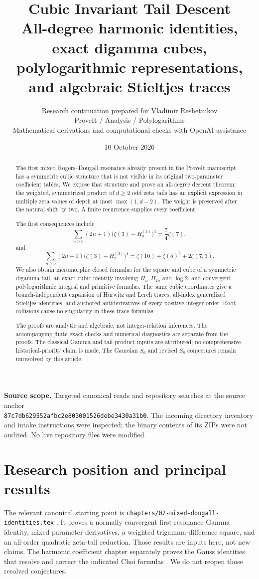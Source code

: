 \documentclass[11pt]{article}
\title{\textbf{Cubic Invariant Tail Descent}\\[5pt]
\large All-degree harmonic identities, exact digamma cubes,\\
polylogarithmic representations, and algebraic Stieltjes traces}
\author{Research continuation prepared for Vladimir Reshetnikov\\
\small ProveIt / Analysis / Polylogarithms\\
\small Mathematical derivations and computational checks with OpenAI assistance}
\date{10 October 2026}
\numberwithin{equation}{section}
\theoremstyle{definition}\newtheorem{definition}[theorem]{Definition}
\theoremstyle{remark}\newtheorem{remark}[theorem]{Remark}
\newcommand{\src}[1]{\nolinkurl{#1}}
\begin{document}
\maketitle
\begin{abstract}
The first mixed Rogers--Dougall resonance already present in the ProveIt
manuscript has a symmetric cubic structure that is not visible in its original
two-parameter coefficient tables. We expose that structure and prove an
all-degree descent theorem: the weighted, symmetrized product of $d\ge2$
odd zeta tails has an explicit expression in multiple zeta values of depth
at most $\max(1,d-2)$. The weight is preserved after the natural shift by
two. A finite recurrence supplies every coefficient.

The first consequences include
\[
 \sum_{n\ge0}(2n+1)\bigl(\zeta(3)-H_n^{(3)}\bigr)^3
       =\frac74\zeta(7),
\]
and
\[
 \sum_{n\ge0}(2n+1)\bigl(\zeta(3)-H_n^{(3)}\bigr)^4
       =\zeta(10)+\zeta(5)^2+2\zeta(7,3).
\]
We also obtain meromorphic closed formulas for the square and cube of a
symmetric digamma tail, an exact cubic identity involving $H_n,H_{2n}$ and
$\log2$, and convergent polylogarithmic integral and primitive formulas.
The same cubic coordinates give a branch-independent expansion of Hurwitz
and Lerch traces, all-index generalized Stieltjes identities, and anchored
antiderivatives of every positive integer order. Root collisions cause no
singularity in these trace formulas.

The proofs are analytic and algebraic, not integer-relation inferences.
The accompanying finite exact checks and numerical diagnostics are separate
from the proofs. The classical Gamma and tail-product inputs are attributed;
no comprehensive historical-priority claim is made. The Gaussian $S_6$ and
revised $S_8$ conjectures remain unresolved by this article.
\end{abstract}
\vfill
\noindent\small\textbf{Source scope.} Targeted canonical reads and repository
searches at the source anchor\\
\src{87c7db629552afbc2e803001526debe3430a31b0}.
The incoming directory inventory and intake instructions were inspected;
the binary contents of its ZIPs were not audited. No live repository files
were modified.\normalsize
\clearpage
\begingroup\small\setlength{\parskip}{0pt}
\tableofcontents
\endgroup
\clearpage

\section{Research position and principal results}
\label{ct:sec:position}
The relevant canonical starting point is
\src{chapters/07-mixed-dougall-identities.tex} \cite{ct:repo-mixed}.
It proves a normally convergent first-resonance Gamma identity, mixed
parameter derivatives, a weighted trigamma-difference square, and an
all-order quadratic zeta-tail reduction. Those results are inputs here,
not new claims. The harmonic coefficient chapter separately proves the
Gauss identities that resolve and correct the indicated Choi formulas
\cite{ct:repo-harmonic}. We do not reopen those resolved conjectures.
\end{document}
